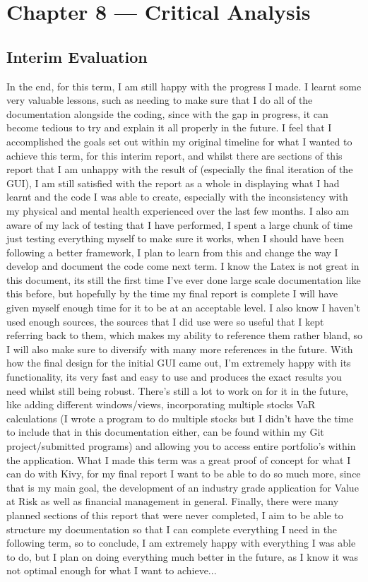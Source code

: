 \documentclass{article}
\begin{document}
\section{Chapter 8 --- Critical Analysis}

\subsection{Interim Evaluation}
In the end, for this term, I am still happy with the progress I made. I learnt some very valuable lessons, such as needing to make sure that I do all of the documentation alongside the coding, since with the gap in progress, it can become tedious to try and explain it all properly in the future. I feel that I accomplished the goals set out within my original timeline for what I wanted to achieve this term, for this interim report, and whilst there are sections of this report that I am unhappy with the result of (especially the final iteration of the GUI), I am still satisfied with the report as a whole in displaying what I had learnt and the code I was able to create, especially with the inconsistency with my physical and mental health experienced over the last few months. I also am aware of my lack of testing that I have performed, I spent a large chunk of time just testing everything myself to make sure it works, when I should have been following a better framework, I plan to learn from this and change the way I develop and document the code come next term. I know the Latex is not great in this document, its still the first time I've ever done large scale documentation like this before, but hopefully by the time my final report is complete I will have given myself enough time for it to be at an acceptable level. I also know I haven't used enough sources, the sources that I did use were so useful that I kept referring back to them, which makes my ability to reference them rather bland, so I will also make sure to diversify with many more references in the future. With how the final design for the initial GUI came out, I'm extremely happy with its functionality, its very fast and easy to use and produces the exact results you need whilst still being robust. There's still a lot to work on for it in the future, like adding different windows/views, incorporating multiple stocks VaR calculations (I wrote a program to do multiple stocks but I didn't have the time to include that in this documentation either, can be found within my Git project/submitted programs) and allowing you to access entire portfolio's within the application. What I made this term was a great proof of concept for what I can do with Kivy, for my final report I want to be able to do so much more, since that is my main goal, the development of an industry grade application for Value at Risk as well as financial management in general. Finally, there were many planned sections of this report that were never completed, I aim to be able to structure my documentation so that I can complete everything I need in the following term, so to conclude, I am extremely happy with everything I was able to do, but I plan on doing everything much better in the future, as I know it was not optimal enough for what I want to achieve...
\end{document}
